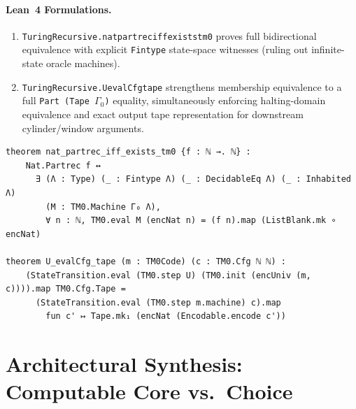 \documentclass[10pt]{article}
\renewcommand{\_}{\origus\allowbreak}
\newcommand{\code}[1]{\texttt{#1}}
\begin{document}
\paragraph{Lean~4 Formulations.}
\begin{enumerate}\sloppy
\item \code{TuringRecursive.nat\_partrec\_iff\_exists\_tm0} proves full bidirectional equivalence
with explicit \code{Fintype} state-space witnesses (ruling out infinite-state oracle machines).
\item \code{TuringRecursive.U\_evalCfg\_tape} strengthens membership equivalence to a full
\code{Part (Tape $\Gamma_0$)} equality, simultaneously enforcing halting-domain equivalence and exact output
tape representation for downstream cylinder/window arguments.
\end{enumerate}

\begin{lstlisting}[caption={Master theorem signatures in \code{Equivalence.lean} and \code{Universal.lean}.}]
theorem nat_partrec_iff_exists_tm0 {f : ℕ →. ℕ} :
    Nat.Partrec f ↔
      ∃ (Λ : Type) (_ : Fintype Λ) (_ : DecidableEq Λ) (_ : Inhabited Λ)
        (M : TM0.Machine Γ₀ Λ),
        ∀ n : ℕ, TM0.eval M (encNat n) = (f n).map (ListBlank.mk ∘ encNat)

theorem U_evalCfg_tape (m : TM0Code) (c : TM0.Cfg ℕ ℕ) :
    (StateTransition.eval (TM0.step U) (TM0.init (encUniv (m, c)))).map TM0.Cfg.Tape =
      (StateTransition.eval (TM0.step m.machine) c).map
        fun c' ↦ Tape.mk₁ (encNat (Encodable.encode c'))
\end{lstlisting}

\section{Architectural Synthesis: Computable Core vs.\ Choice}
\end{document}
